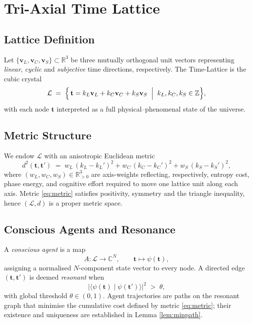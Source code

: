 \documentclass[11pt]{article}
\begin{document}
\section{Tri-Axial Time Lattice}

\subsection{Lattice Definition}\label{sec:lattice-def}
Let $\{\mathbf v_L,\mathbf v_C,\mathbf v_S\}\subset\mathbb R^{3}$ be
three mutually orthogonal unit vectors representing \emph{linear},
\emph{cyclic} and \emph{subjective} time directions, respectively.
The Time-Lattice is the cubic crystal
\begin{equation}
  \mathcal L \;=\; \Bigl\{\,
    \mathbf t = k_L \mathbf v_L + k_C \mathbf v_C + k_S \mathbf v_S
    \;\Bigm|\;
    k_L,k_C,k_S\in\mathbb Z
  \Bigr\},
\end{equation}
with each node $\mathbf t$ interpreted as a full physical–phenomenal
state of the universe.

\subsection{Metric Structure}\label{sec:metric}
We endow $\mathcal L$ with an anisotropic Euclidean metric
\begin{equation}
  d^{2}(\mathbf t,\mathbf t') \;=\;
  w_L\,(k_L-k_L')^{2}
  + w_C\,(k_C-k_C')^{2}
  + w_S\,(k_S-k_S')^{2},
  \label{eq:metric}
\end{equation}
where $(w_L,w_C,w_S)\in\mathbb R_{>0}^{3}$ are axis-weights reflecting,
respectively, entropy cost, phase energy, and cognitive effort required
to move one lattice unit along each axis.  Metric \eqref{eq:metric}
satisfies positivity, symmetry and the triangle inequality, hence
$(\mathcal L,d)$ is a proper metric space.

\subsection{Conscious Agents and Resonance}\label{sec:agents}
A \emph{conscious agent} is a map
\[
  A\colon \mathcal L \longrightarrow \mathbb C^{N},
  \qquad
  \mathbf t \mapsto \psi(\mathbf t),
\]
assigning a normalised $N$-component state vector to every node.
A directed edge $(\mathbf t,\mathbf t')$ is deemed \emph{resonant} when
\begin{equation}
  \bigl|\langle \psi(\mathbf t)\mid\psi(\mathbf t')\rangle\bigr|^{2}
  \;>\;\theta,
  \label{eq:res-ineq}
\end{equation}
with global threshold $\theta\in(0,1)$.  Agent trajectories are paths on
the resonant graph that minimise the cumulative cost defined by metric
\eqref{eq:metric}; their existence and uniqueness are established in
Lemma \ref{lem:minpath}.
\end{document}
